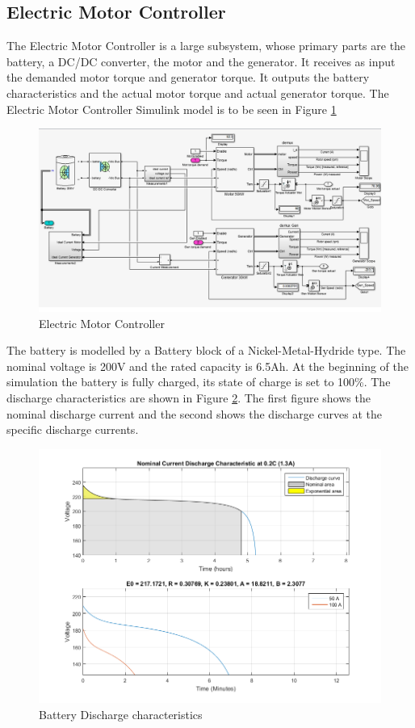 \subsection{Electric Motor Controller}
The Electric Motor Controller is a large subsystem, whose primary parts are the battery, a DC/DC converter, the motor and the generator. It receives as input the demanded motor torque and generator torque. It outputs the battery characteristics and the actual motor torque and actual generator torque. The Electric Motor Controller Simulink model is to be seen in Figure \ref{fig:motorController}

\begin{figure}[h]
\centering
\includegraphics[scale=0.48]{figures/electricmotorcontroller}
\caption{Electric Motor Controller}
\label{fig:motorController}
\end{figure}

The battery is modelled by a Battery block of a Nickel-Metal-Hydride type. The nominal voltage is 200V and the rated capacity is 6.5Ah. At the beginning of the simulation the battery is fully charged, its state of charge is set to 100\%. The discharge characteristics are shown in Figure \ref{fig:batteryDischarge}. The first figure shows the nominal discharge current and the second shows the discharge curves at the specific discharge currents. 

\begin{figure}[h]
\centering
\includegraphics[scale=0.5]{figures/battery}
\caption{Battery Discharge characteristics}
\label{fig:batteryDischarge}
\end{figure}


